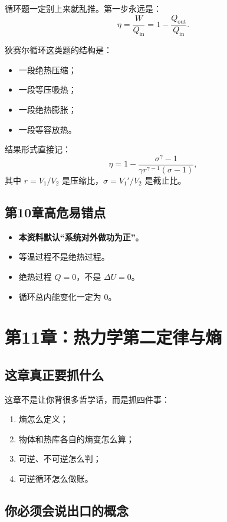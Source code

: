 \documentclass[12pt,a4paper]{article}
\newcommand{\warn}[1]{\textcolor{red!70!black}{\textbf{#1}}}
\begin{document}
循环题一定别上来就乱推。第一步永远是：
\[
\eta=\frac{W}{Q_{\text{in}}}=1-\frac{Q_{\text{out}}}{Q_{\text{in}}}.
\]

狄赛尔循环这类题的结构是：

\begin{itemize}
  \item 一段绝热压缩；
  \item 一段等压吸热；
  \item 一段绝热膨胀；
  \item 一段等容放热。
\end{itemize}

结果形式直接记：
\[
\eta = 1-\frac{\sigma^\gamma - 1}{\gamma r^{\gamma-1}(\sigma - 1)},
\]
其中 $r=V_1/V_2$ 是压缩比，$\sigma=V_1'/V_2$ 是截止比。

\subsection{第10章高危易错点}

\begin{itemize}
  \item \warn{本资料默认“系统对外做功为正”}。
  \item 等温过程不是绝热过程。
  \item 绝热过程 $Q=0$，不是 $\Delta U=0$。
  \item 循环总内能变化一定为 0。
\end{itemize}

\section{第11章：热力学第二定律与熵}

\subsection{这章真正要抓什么}

这章不是让你背很多哲学话，而是抓四件事：

\begin{enumerate}
  \item 熵怎么定义；
  \item 物体和热库各自的熵变怎么算；
  \item 可逆、不可逆怎么判；
  \item 可逆循环怎么做账。
\end{enumerate}

\subsection{你必须会说出口的概念}
\end{document}
